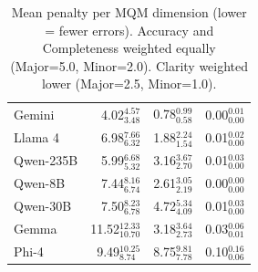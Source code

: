 \begin{table}[h]
\begin{minipage}[t]{0.48\textwidth}
\begin{tabular}{@{}lrrr@{}}
Gemini & 4.02$_{\scriptstyle 3.48}^{\scriptstyle 4.57}$ & 0.78$_{\scriptstyle 0.58}^{\scriptstyle 0.99}$ & 0.00$_{\scriptstyle 0.00}^{\scriptstyle 0.01}$ \\
Llama 4 & 6.98$_{\scriptstyle 6.32}^{\scriptstyle 7.66}$ & 1.88$_{\scriptstyle 1.54}^{\scriptstyle 2.24}$ & 0.01$_{\scriptstyle 0.00}^{\scriptstyle 0.02}$ \\
Qwen-235B & 5.99$_{\scriptstyle 5.32}^{\scriptstyle 6.68}$ & 3.16$_{\scriptstyle 2.70}^{\scriptstyle 3.67}$ & 0.01$_{\scriptstyle 0.00}^{\scriptstyle 0.03}$ \\
Qwen-8B & 7.44$_{\scriptstyle 6.74}^{\scriptstyle 8.16}$ & 2.61$_{\scriptstyle 2.19}^{\scriptstyle 3.05}$ & 0.00$_{\scriptstyle 0.00}^{\scriptstyle 0.00}$ \\
Qwen-30B & 7.50$_{\scriptstyle 6.78}^{\scriptstyle 8.23}$ & 4.72$_{\scriptstyle 4.09}^{\scriptstyle 5.34}$ & 0.01$_{\scriptstyle 0.00}^{\scriptstyle 0.03}$ \\
Gemma & 11.52$_{\scriptstyle 10.70}^{\scriptstyle 12.33}$ & 3.18$_{\scriptstyle 2.73}^{\scriptstyle 3.64}$ & 0.03$_{\scriptstyle 0.01}^{\scriptstyle 0.06}$ \\
Phi-4 & 9.49$_{\scriptstyle 8.74}^{\scriptstyle 10.25}$ & 8.75$_{\scriptstyle 7.78}^{\scriptstyle 9.81}$ & 0.10$_{\scriptstyle 0.06}^{\scriptstyle 0.16}$ \\
\bottomrule
\end{tabular}
\caption{Mean penalty per MQM dimension (lower = fewer errors). Accuracy and Completeness weighted equally (Major=5.0, Minor=2.0). Clarity weighted lower (Major=2.5, Minor=1.0).}
\label{tab:mqm-dimensions}
\end{minipage}
\end{table}

